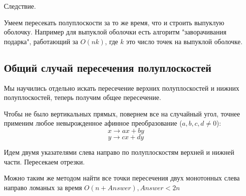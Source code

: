 Следствие.

Умеем пересекать полуплоскости за то же время, что и строить выпуклую оболочку. Например для выпуклой оболочки есть алгоритм "заворачивания подарка", работающий за $O(nk)$, где $k$ это число точек на выпуклой оболочке.

\subsection{Общий случай пересечения полуплоскостей}
Мы научились отдельно искать пересечение верхних полуплоскостей и нижних полуплоскостей, теперь получим общее пересечение.

Чтобы не было вертикальных прямых, повернем все на случайный угол, точнее применим любое невырожденное афинное преобразование ($a,b,c,d \ne 0$):
$$x \rightarrow ax+by$$
$$y \rightarrow cx+dy$$

Идем двумя указателями слева направо по полуплоскостям верхней и нижней части. 
Пересекаем отрезки.

Можно таким же методом найти все точки пересечения двух монотонных слева направо ломаных за время $O(n + Answer), Answer < 2n$
